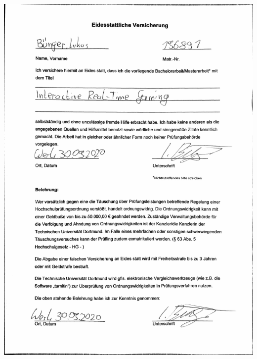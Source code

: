 \pagestyle{empty}
\includegraphics[trim = 20mm 20mm 20mm 10mm, clip,
width=\textwidth]{Lukas_Eidesstattliche_Versicherung.pdf}

